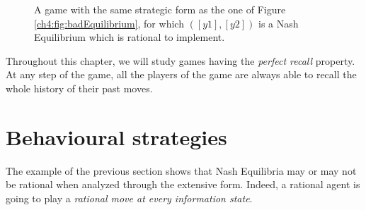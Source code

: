 \begin{example}
\begin{figure}[!ht]
\begin{center}
\end{center}
\caption{A game with the same strategic form as the one of Figure \ref{ch4:fig:badEquilibrium}, for which $([y1],[y2])$ is a Nash Equilibrium which is rational to implement.}
\label{ch4:fig:badEquilibrium2}
\end{figure}

\end{example}

Throughout this chapter, we will study games having the \emph{perfect recall} property. At any step of the game, all the players of the game are always able to recall the whole history of their past moves.

\section{Behavioural strategies}
\label{ch4:sec:extform}
The example of the previous section shows that Nash Equilibria may or may not be rational when analyzed through the extensive form. Indeed, a rational agent is going to play a \emph{rational move at every information state}.\\

